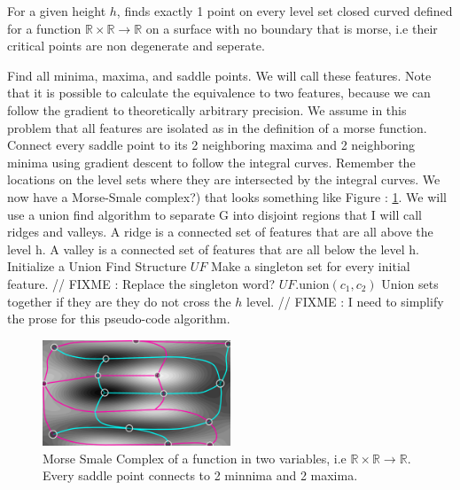 \documentclass[12pt, letterpaper]{article}
\begin{document}
		\begin{algorithm}
		\caption{For a given height $h$, finds exactly 1 point on every level set closed curved defined for a function $\mathbb{R} \times \mathbb{R} \rightarrow \mathbb{R}$ on a surface with no boundary that is morse,
			     i.e their critical points are non degenerate and seperate.}
		\label{alg:findAllUniqueLevelSets}
		\begin{algorithmic}
		\STATE	Find all minima, maxima, and saddle points.
				We will call these features.
				Note that it is possible to calculate the equivalence to two features,
				because we can follow the gradient to theoretically arbitrary precision.
				We assume in this problem that all features are isolated as in the definition of a morse function.
		\STATE	Connect every saddle point to its 2 neighboring maxima and 2 neighboring minima using gradient descent to follow the integral curves.
				Remember the locations on the level sets where they are intersected by the integral curves.
		\STATE     We now have a Morse-Smale complex?) that looks something like Figure : \ref{fig:MorseSmale}.
		\STATE	We will use a union find algorithm to separate G into disjoint regions that I will call ridges and valleys.
				A ridge is a connected set of features that are all above the level h.
				A valley is a connected set of features that are all below the level h.
		\STATE Initialize a Union Find Structure $UF$
		\STATE Make a singleton set for every initial feature. // FIXME : Replace the singleton word?
				\STATE $UF$.union$(c_{1}, c_{2})$ Union sets together if they are they do not cross the $h$ level.
			\ENDIF
		\ENDFOR
// FIXME : I need to simplify the prose for this pseudo-code algorithm.
		\end{algorithmic}
		\end{algorithm}


\begin{figure}[h]
\centering
\includegraphics[width=0.5\textwidth]{minima_maxima_saddle_graph.png}
\caption{Morse Smale Complex of a function in two variables, i.e $\mathbb{R} \times \mathbb{R} \rightarrow \mathbb{R}$. Every saddle point connects to 2 minnima and 2 maxima.}
\label{fig:MorseSmale}
\end{figure}
\end{document}
